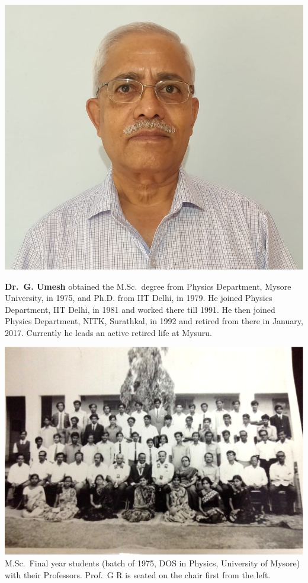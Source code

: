 \centerline{\includegraphics[scale=0.15]{authorsphotos/G_Umesh.jpg}}
\bigskip

\noindent
\textbf{Dr.\ G. Umesh} obtained the M.Sc.\ degree from Physics Department, Mysore University, in 1975, and  Ph.D. from IIT Delhi, in 1979. He joined Physics Department, IIT Delhi, in 1981 and worked there till 1991. He then joined Physics Department, NITK, Surathkal, in 1992 and retired from there in January, 2017. Currently he leads an active retired life at Mysuru.

\begin{center}
\includegraphics[scale=0.278]{src/images/chap8/8.eps}\\[3pt]
M.Sc.\ Final year students (batch of 1975, DOS in Physics, University of Mysore) 
with their Professors. Prof.\ G R is seated on the chair first from the left.
\end{center}
